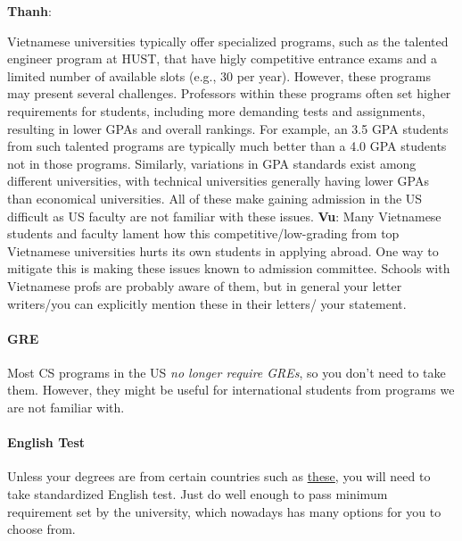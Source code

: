 \documentclass[11pt]{article}
\newenvironment{commentbox}[1][]{
\small
    \begin{cbox}
    \textbf{#1}: 
 }{
   \end{cbox}
}
\begin{document}
\begin{commentbox}[Thanh]
Vietnamese universities typically offer specialized programs, such as the talented engineer program at HUST, that have higly competitive entrance exams and a limited number of available slots (e.g., 30 per year). However, these programs may present several challenges. Professors within these programs often set higher requirements for students, including more demanding tests and assignments, resulting in lower GPAs and overall rankings. For example, an 3.5 GPA students from such talented programs are typically much better than a 4.0 GPA students not in those programs.  Similarly, variations in GPA standards exist among different universities, with technical universities generally having lower GPAs than economical universities. All of these make gaining admission in the US difficult as US faculty are not familiar with these issues.
\tcblower
\textbf{Vu}: Many Vietnamese students and faculty lament how this competitive/low-grading from top Vietnamese universities hurts its own students in applying abroad. One way to mitigate this is making these issues known to admission committee.  Schools with Vietnamese profs are probably aware of them, but in general your letter writers/you can explicitly mention these in their letters/ your statement.
\end{commentbox}

\paragraph{GRE} Most CS programs in the US \emph{no longer require GREs}, so you don't need to
take them. However, they might be useful for international students from programs we are not familiar with. 

\paragraph{English Test} Unless your degrees are from certain countries such as \href{https://github.com/dynaroars/dynaroars.github.io/wiki/About-GMU#standard-tests-waiver-eligible-countries}{these}, you will need to
take standardized English test. Just do well enough to pass minimum requirement set by the university, which nowadays has many options for you to choose from.
\end{document}
